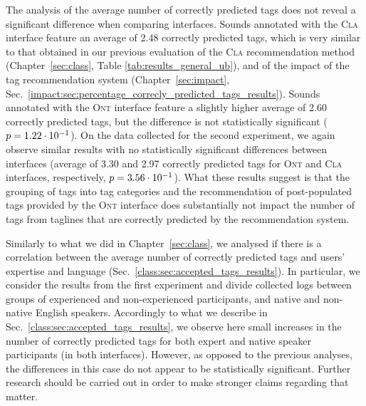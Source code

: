 

The analysis of the average number of correctly predicted tags does not reveal a significant difference when comparing interfaces.
Sounds annotated with the \textsc{Cla} interface feature an average of 2.48 correctly predicted tags, which is very similar to that obtained in our previous evaluation of the \textsc{Cla} recommendation method (Chapter~\ref{sec:class}, Table \ref{tab:results_general_ub}), and of the impact of the tag recommendation system (Chapter~\ref{sec:impact}, Sec.~\ref{impact:sec:percentage_correcly_predicted_tags_results}).
Sounds annotated with the \textsc{Ont} interface feature a slightly higher average of 2.60 correctly predicted tags, but the difference is not statistically significant ($p = 1.22\cdot 10^{-1}$).
On the data collected for the second experiment, we again observe similar results with no statistically significant differences between interfaces (average of 3.30 and 2.97 correctly predicted tags for \textsc{Ont} and \textsc{Cla} interfaces, respectively, $p = 3.56\cdot 10^{-1}$).
What these results suggest is that the grouping of tags into tag categories and the recommendation of post-populated tags provided by the \textsc{Ont} interface does substantially not impact the number of tags from taglines that are correctly predicted by the recommendation system. 

Similarly to what we did in Chapter~\ref{sec:class}, we analysed if there is a correlation between the average number of correctly predicted tags and users' expertise and language (Sec.~\ref{class:sec:accepted_tags_results}). In particular, we consider the results from the first experiment and divide collected logs between groups of experienced and non-experienced participants, and native and non-native English speakers. Accordingly to what we describe in Sec.~\ref{class:sec:accepted_tags_results}, we observe here small increases in the number of correctly predicted tags for both expert and native speaker participants (in both interfaces). However, as opposed to the previous analyses, the differences in this case do not appear to be statistically significant.
Further research should be carried out in order to make stronger claims regarding that matter.


